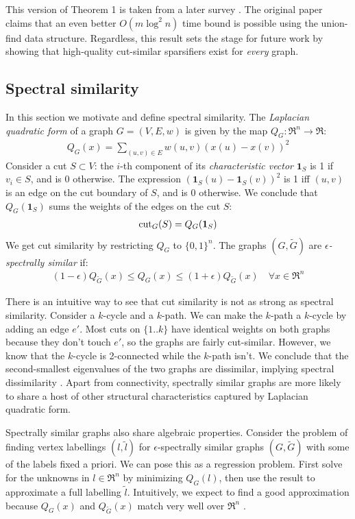 \documentclass{article}
\begin{document}
This version of Theorem 1 is taken from a later survey \cite{TheSurvey}. The
original paper claims that an even better $O(m\log^2 n)$ time bound is
possible using the union-find data structure. Regardless, this result sets
the stage for future work by showing that high-quality cut-similar
sparsifiers exist for \textit{every} graph. 

\subsection{Spectral similarity}

In this section we motivate and define spectral similarity. The
\textit{Laplacian quadratic form} of a graph $G = (V, E, w)$ is given by the
map $Q_G : \Re^n \rightarrow \Re$:
\begin{align*}
    Q_G(x) = \sum_{(u, v) \in E} w(u, v)(x(u) - x(v))^2
\end{align*}
Consider a cut $S \subset V$: the $i$-th component of its
\textit{characteristic vector} $\mathbf{1}_S$ is 1 if $v_i \in S$, and is 0
otherwise. The expression $(\mathbf{1}_S(u) - \mathbf{1}_S(v))^2$ is 1 iff
$(u, v)$ is an edge on the cut boundary of $S$, and is 0 otherwise. We
conclude that $Q_G(\mathbf{1}_S)$ sums the weights of the edges on the cut
$S$:
\begin{align*}
    \text{cut}_{G}(S) = Q_G(\mathbf{1}_S)
\end{align*}
We get cut similarity by restricting $Q_G$ to $\{0, 1\}^n$. The graphs $(G,
\tilde{G})$ are \textit{$\epsilon$-spectrally similar} if:
\begin{align*}
    (1 - \epsilon)Q_{\tilde{G}}(x) \leq Q_G(x) \leq (1 +
    \epsilon)Q_{\tilde{G}}(x) \quad \forall{x \in \Re^n}
\end{align*}

There is an intuitive way to see that cut similarity is not as strong as
spectral similarity. Consider a $k$-cycle and a $k$-path. We can make the
$k$-path a $k$-cycle by adding an edge $e'$. Most cuts on $\{1..k\}$ have
identical weights on both graphs because they don't touch $e'$, so the
graphs are fairly cut-similar. However, we know that the $k$-cycle is
2-connected while the $k$-path isn't. We conclude that the second-smallest
eigenvalues of the two graphs are dissimilar, implying spectral
dissimilarity \cite{Fiedler}. Apart from connectivity, spectrally similar
graphs are more likely to share a host of other structural characteristics
captured by Laplacian quadratic form.

Spectrally similar graphs also share algebraic properties. Consider the
problem of finding vertex labellings $(l, \tilde{l})$ for
$\epsilon$-spectrally similar graphs $(G, \tilde{G})$ with some of the
labels fixed a priori. We can pose this as a regression problem. First solve
for the unknowns in $l \in \Re^n$ by minimizing $Q_G(l)$, then use the
result to approximate a full labelling $\tilde{l}$. Intuitively, we expect
to find a good approximation because $Q_G(x)$ and $Q_{\tilde{G}}(x)$ match
very well over $\Re^n$ \cite{TheSurvey}.
\end{document}
